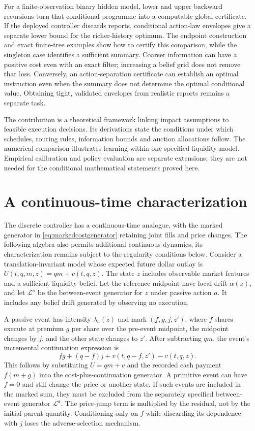 \documentclass[11pt]{article}
\numberwithin{equation}{section}
\theoremstyle{definition}
\theoremstyle{remark}
\theoremstyle{definition}
\begin{document}
For a finite-observation binary hidden model, lower and upper backward
recursions turn that conditional programme into a computable global
certificate. If the deployed controller discards reports, conditional
action-law envelopes give a separate lower bound for the richer-history
optimum. The endpoint construction and exact finite-tree examples show how
to certify this comparison, while the singleton case identifies a sufficient
summary. Coarser information can have a positive cost even with an exact
filter; increasing a belief grid does not remove that loss. Conversely,
an action-separation certificate can establish an optimal instruction even
when the summary does not determine the optimal conditional value.
Obtaining tight, validated envelopes from realistic reports remains a
separate task.

The contribution is a theoretical framework linking impact assumptions to
feasible execution decisions. Its derivations state the conditions under which
schedules, routing rules, information bounds and auction allocations follow.
The numerical comparison illustrates learning within one specified liquidity
model. Empirical calibration and policy evaluation are separate extensions;
they are not needed for the conditional mathematical statements proved here.

\appendix
\section{A continuous-time characterization}\label{app:hjb}

The discrete controller has a continuous-time analogue, with the marked
generator in \eqref{eq:markedcostgenerator} retaining joint fills and price
changes. The following algebra also permits additional continuous dynamics;
its characterization remains subject to the regularity conditions below. Consider a translation-invariant
model whose expected future dollar outlay is $U(t,q,m,z)=qm+v(t,q,z)$.
The state $z$ includes observable market features and a sufficient liquidity
belief. Let the reference midpoint have local drift $\alpha(z)$, and let
$\mathcal L^a$ be the between-event generator for $z$ under passive action $a$.
It includes any belief drift generated by observing no execution.

A passive event has intensity $\lambda_a(z)$ and mark $(f,g,j,z')$, where
$f$ shares execute at premium $g$ per share over the pre-event midpoint,
the midpoint changes by $j$, and the other state changes to $z'$.
After subtracting $qm$, the event's incremental continuation expression is
\begin{equation}\label{eq:jumpcost}
 fg+(q-f)j+v(t,q-f,z')-v(t,q,z).
\end{equation}
This follows by substituting $U=qm+v$ and the recorded cash payment
$f(m+g)$ into the cost-plus-continuation generator. A primitive event can
have $f=0$ and still change the price or another state. If such events are
included in the marked sum, they must be excluded from the separately
specified between-event generator $\mathcal L^a$.
The price-jump term is multiplied by the residual, not by the initial parent
quantity. Conditioning only on $f$ while discarding its dependence with $j$
loses the adverse-selection mechanism.
\end{document}
